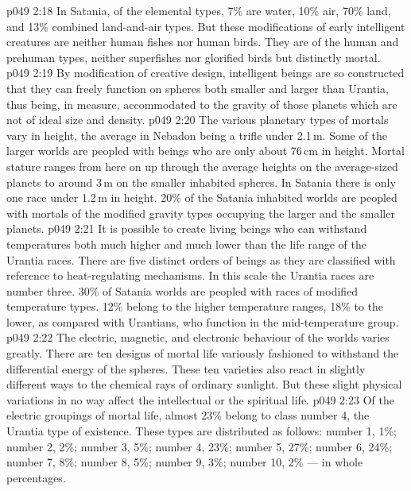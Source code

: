 \vs p049 2:18 In Satania, of the elemental types, 7\% are water, 10\% air, 70\% land, and 13\% combined land\hyp{}and\hyp{}air types. But these modifications of early intelligent creatures are neither human fishes nor human birds. They are of the human and prehuman types, neither superfishes nor glorified birds but distinctly mortal.
\vs p049 2:19 \bibnobreakspace {} By modification of creative design, intelligent beings are so constructed that they can freely function on spheres both smaller and larger than Urantia, thus being, in measure, accommodated to the gravity of those planets which are not of ideal size and density.
\vs p049 2:20 The various planetary types of mortals vary in height, the average in Nebadon being a trifle under 2.1\,m. Some of the larger worlds are peopled with beings who are only about 76\,cm in height. Mortal stature ranges from here on up through the average heights on the average\hyp{}sized planets to around 3\,m on the smaller inhabited spheres. In Satania there is only one race under 1.2\,m in height. 20\% of the Satania inhabited worlds are peopled with mortals of the modified gravity types occupying the larger and the smaller planets.
\vs p049 2:21 \bibnobreakspace {} It is possible to create living beings who can withstand temperatures both much higher and much lower than the life range of the Urantia races. There are five distinct orders of beings as they are classified with reference to heat\hyp{}regulating mechanisms. In this scale the Urantia races are number three. 30\% of Satania worlds are peopled with races of modified temperature types. 12\% belong to the higher temperature ranges, 18\% to the lower, as compared with Urantians, who function in the mid\hyp{}temperature group.
\vs p049 2:22 \bibnobreakspace {} The electric, magnetic, and electronic behaviour of the worlds varies greatly. There are ten designs of mortal life variously fashioned to withstand the differential energy of the spheres. These ten varieties also react in slightly different ways to the chemical rays of ordinary sunlight. But these slight physical variations in no way affect the intellectual or the spiritual life.
\vs p049 2:23 Of the electric groupings of mortal life, almost 23\% belong to class number 4, the Urantia type of existence. These types are distributed as follows: number 1, 1\%; number 2, 2\%; number 3, 5\%; number 4, 23\%; number 5, 27\%; number 6, 24\%; number 7, 8\%; number 8, 5\%; number 9, 3\%; number 10, 2\% --- in whole percentages.
